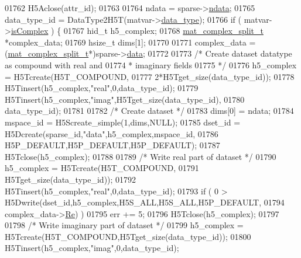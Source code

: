 \begin{DoxyCode}
{{{01762         H5Aclose(attr\_id);
01763 
01764         ndata = sparse->\hyperlink{group___m_a_t_a1beb8a8c58a808207cbea650563a9b63}{ndata};
01765         data\_type\_id = DataType2H5T(matvar->\hyperlink{group___m_a_t_ab6aafe9bd77f0f077852593dec438144}{data\_type});
01766         \textcolor{keywordflow}{if} ( matvar->\hyperlink{group___m_a_t_aeb03b3a69f108dc05470b00443a43739}{isComplex} ) \{
01767             hid\_t h5\_complex;
01768             \hyperlink{group___m_a_t_structmat__complex__split__t}{mat\_complex\_split\_t} *complex\_data;
01769             hsize\_t dims[1];
01770 
01771             complex\_data = (\hyperlink{group___m_a_t_structmat__complex__split__t}{mat\_complex\_split\_t}*)sparse->\hyperlink{group___m_a_t_ae2c648cb9eac4ce47f26cddb44246152}{data};
01772 
01773             \textcolor{comment}{/* Create dataset datatype as compound with real and}
01774 \textcolor{comment}{             * imaginary fields}
01775 \textcolor{comment}{             */}
01776             h5\_complex = H5Tcreate(H5T\_COMPOUND,
01777                                    2*H5Tget\_size(data\_type\_id));
01778             H5Tinsert(h5\_complex,\textcolor{stringliteral}{"real"},0,data\_type\_id);
01779             H5Tinsert(h5\_complex,\textcolor{stringliteral}{"imag"},H5Tget\_size(data\_type\_id),
01780                       data\_type\_id);
01781 
01782             \textcolor{comment}{/* Create dataset */}
01783             dims[0] = ndata;
01784             mspace\_id = H5Screate\_simple(1,dims,NULL);
01785             dset\_id = H5Dcreate(sparse\_id,\textcolor{stringliteral}{"data"},h5\_complex,mspace\_id,
01786                                 H5P\_DEFAULT,H5P\_DEFAULT,H5P\_DEFAULT);
01787             H5Tclose(h5\_complex);
01788 
01789             \textcolor{comment}{/* Write real part of dataset */}
01790             h5\_complex = H5Tcreate(H5T\_COMPOUND,
01791                                    H5Tget\_size(data\_type\_id));
01792             H5Tinsert(h5\_complex,\textcolor{stringliteral}{"real"},0,data\_type\_id);
01793             \textcolor{keywordflow}{if} ( 0 > H5Dwrite(dset\_id,h5\_complex,H5S\_ALL,H5S\_ALL,H5P\_DEFAULT,
01794                               complex\_data->\hyperlink{group___m_a_t_a484a93607508adac2bce53a0252e0325}{Re}) )
01795                 err += 5;
01796             H5Tclose(h5\_complex);
01797 
01798             \textcolor{comment}{/* Write imaginary part of dataset */}
01799             h5\_complex = H5Tcreate(H5T\_COMPOUND,H5Tget\_size(data\_type\_id));
01800             H5Tinsert(h5\_complex,\textcolor{stringliteral}{"imag"},0,data\_type\_id);
}}}
\end{DoxyCode}
